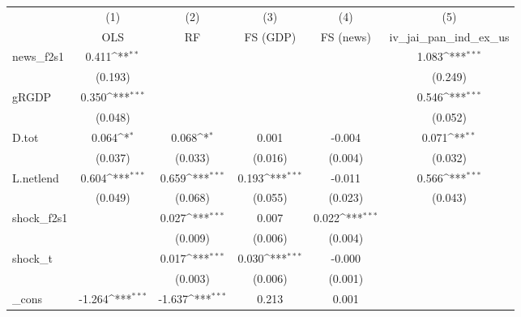 {
\def\sym#1{\ifmmode^{#1}\else\(^{#1}\)\fi}
\begin{tabular}{l*{5}{c}}
\toprule
            &\multicolumn{1}{c}{(1)}&\multicolumn{1}{c}{(2)}&\multicolumn{1}{c}{(3)}&\multicolumn{1}{c}{(4)}&\multicolumn{1}{c}{(5)}\\
            &\multicolumn{1}{c}{OLS}&\multicolumn{1}{c}{RF}&\multicolumn{1}{c}{FS (GDP)}&\multicolumn{1}{c}{FS (news)}&\multicolumn{1}{c}{iv\_jai\_pan\_ind\_ex\_us}\\
\midrule
news\_f2s1   &       0.411\sym{**} &                     &                     &                     &       1.083\sym{***}\\
            &     (0.193)         &                     &                     &                     &     (0.249)         \\
\addlinespace
gRGDP       &       0.350\sym{***}&                     &                     &                     &       0.546\sym{***}\\
            &     (0.048)         &                     &                     &                     &     (0.052)         \\
\addlinespace
D.tot       &       0.064\sym{*}  &       0.068\sym{*}  &       0.001         &      -0.004         &       0.071\sym{**} \\
            &     (0.037)         &     (0.033)         &     (0.016)         &     (0.004)         &     (0.032)         \\
\addlinespace
L.netlend   &       0.604\sym{***}&       0.659\sym{***}&       0.193\sym{***}&      -0.011         &       0.566\sym{***}\\
            &     (0.049)         &     (0.068)         &     (0.055)         &     (0.023)         &     (0.043)         \\
\addlinespace
shock\_f2s1  &                     &       0.027\sym{***}&       0.007         &       0.022\sym{***}&                     \\
            &                     &     (0.009)         &     (0.006)         &     (0.004)         &                     \\
\addlinespace
shock\_t     &                     &       0.017\sym{***}&       0.030\sym{***}&      -0.000         &                     \\
            &                     &     (0.003)         &     (0.006)         &     (0.001)         &                     \\
\addlinespace
\_cons      &      -1.264\sym{***}&      -1.637\sym{***}&       0.213         &       0.001         &                     \\

\end{tabular}}
